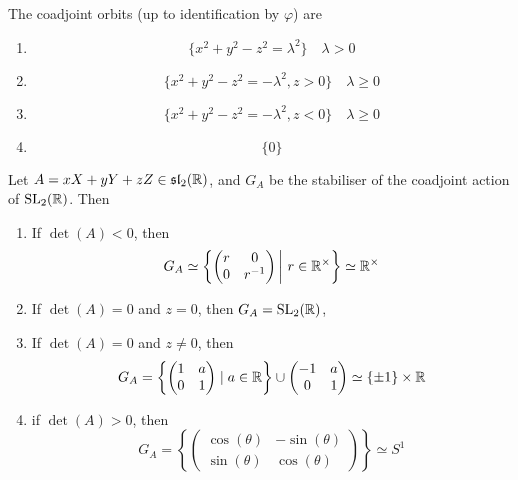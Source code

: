 \documentclass{article}
\renewcommand{\sl}{\mfs\mfl}
\begin{document}
\begin{proposition}
    The coadjoint orbits (up to identification by \(\varphi\)) are

    \begin{enumerate}
        \item \[\{x^2 + y^2 - z^2 = \lambda^2\} \quad \lambda > 0\]
        \item \[\{x^2 + y^2 - z^2 = -\lambda^2, z > 0\} \quad \lambda \ge 0\]
        \item \[\{x^2 + y^2 - z^2 = -\lambda^2, z < 0\} \quad \lambda \ge 0\]
        \item \[\{0\}\]
    \end{enumerate}
\end{proposition}

\begin{proposition}
    Let \(A = xX + yY + zZ \in \sl_2(\R)\), and \(G_A\) be the stabiliser of the coadjoint action of \(\operatorname{SL}_2(\mathbb{R})\). Then

    \begin{enumerate}
        \item If \(\det(A) < 0\), then \[G_A \simeq \left\{\begin{pmatrix}
            r & 0 \\ 0 & r^{-1}
        \end{pmatrix} \bigg\vert\ r \in \mathbb{R}^\times\right\} \simeq \mathbb{R}^\times\]
        \item If \(\det(A) = 0\) and \(z = 0\), then \(G_A = \operatorname{SL}_2(\mathbb{R})\),
        \item If \(\det(A) = 0\) and \(z \ne 0\), then
        \[G_A = \left\{\begin{pmatrix}
            1 & a \\ 0 & 1
        \end{pmatrix} \mid a \in \mathbb{R}\right\} \cup \begin{pmatrix}
            -1 & a \\ 0 & 1
        \end{pmatrix} \simeq \{\pm 1\} \times \mathbb{R}\]
        \item if \(\det(A) > 0\), then
        \[G_A = \left\{\begin{pmatrix}
            \cos(\theta) & -\sin(\theta) \\
            \sin(\theta) & \cos(\theta)
        \end{pmatrix}\right\} \simeq S^1\]
    \end{enumerate}
\end{proposition}
\end{document}

